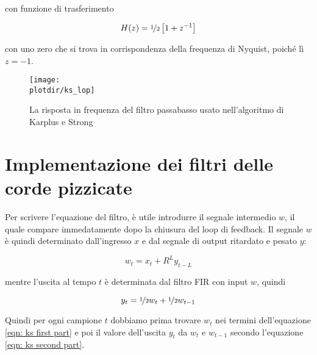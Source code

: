 con funzione di trasferimento

\begin{equation}\label{eqn: ks lop transfer function}
				H (z) = \nicefrac{1}{2} \left [ 1 + z^{-1} \right ]
\end{equation}

con uno zero che si trova in corrispondenza della frequenza di Nyquist,
poich\'e l\`i $z = -1$.
% 

\begin{figure}[htbp]
	\begin{center}
		\texttt{[image: \\plotdir/ks\_lop]}
		\caption{La risposta in frequenza del filtro passabasso usato
		nell'algoritmo di Karplus e Strong\label{fig:ks lop frequency response}}
	\end{center}
\end{figure}

\section{Implementazione dei filtri delle corde pizzicate}

Per scrivere l'equazione del filtro,
\`e utile introdurre il segnale intermedio $w$,
il quale compare immedatamente dopo la chiusura del loop di feedback.
Il segnale $w$ \`e quindi determinato dall'ingresso $x$ e dal segnale di
output ritardato e pesato $y$:

\begin{equation}\label{eqn: ks first part}
				w_t = x_t + R^{L} y_{t-L}
\end{equation}

mentre l'uscita al tempo $t$ \`e determinata dal filtro FIR con input $w$,
quindi

\begin{equation}\label{eqn: ks second part}
				y_t = \nicefrac{1}{2} w_t + \nicefrac{1}{2} w_{t - 1}
\end{equation}

Quindi per ogni campione $t$ dobbiamo prima trovare $w_t$ nei termini
dell'equazione \ref{eqn: ks first part} e poi il valore dell'uscita $y_t$ da
$w_t$ e $w_{t - 1}$ secondo l'equazione \ref{eqn: ks second part}.

